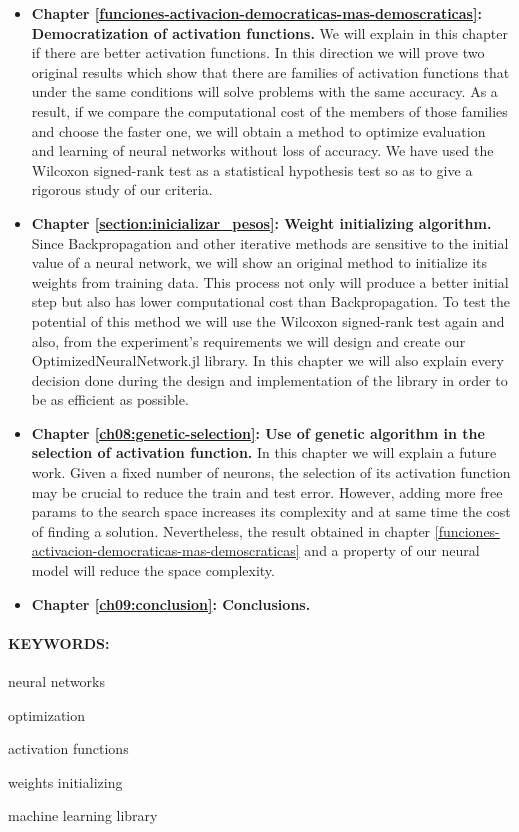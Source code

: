 \begin{itemize}
\item \textbf{Chapter \ref{funciones-activacion-democraticas-mas-demoscraticas}: Democratization of activation functions.} 
We will explain in this chapter if there are better activation functions. In this 
direction we will prove two original results which show that there are families of 
activation functions that under the same conditions will solve problems with the same 
accuracy. As a result, if we compare the computational cost of the members of those 
families and choose the faster one, we will obtain a method to optimize evaluation and 
learning of neural networks without loss of accuracy. We have used the Wilcoxon 
signed-rank test as a statistical hypothesis test so as to give a rigorous study of 
our criteria. 

\item \textbf{Chapter \ref{section:inicializar_pesos}: Weight initializing algorithm.} 
Since Backpropagation and other iterative  methods are sensitive to the initial 
value of a neural network, we will show an original method to initialize its weights 
from training data. This process not only will produce a better initial step but also 
has lower computational cost than Backpropagation.  To test the potential of this 
method we will use the Wilcoxon signed-rank test again and also, from the experiment's 
requirements we will design and create our OptimizedNeuralNetwork.jl library. In this chapter we 
will also explain every decision done during the design and implementation of the 
library in order to be as efficient as possible.	

\item \textbf{Chapter \ref{ch08:genetic-selection}: Use of genetic algorithm in the selection of activation function.} 
In this chapter we will explain a future work. Given a fixed number of neurons, the 
selection of its activation function may be crucial to reduce the train and test 
error.  However, adding more free params to the search space increases its complexity 
and at same time the cost of finding a solution.  Nevertheless, the result obtained in 
chapter \ref{funciones-activacion-democraticas-mas-demoscraticas} and a property of our neural model will reduce the space complexity.

\item \textbf{Chapter \ref{ch09:conclusion}: Conclusions.}
\end{itemize} 

\paragraph{KEYWORDS:}
\begin{itemize*}[label=,itemsep=1em,itemjoin=\hspace{1em}]
  \item neural networks
  \item optimization
  \item activation functions
  \item weights initializing
  \item machine learning library
\end{itemize*}

\endinput
